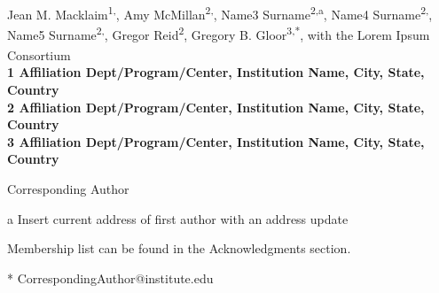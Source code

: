 \documentclass[10pt,letterpaper]{article}
\date{}
\begin{document}
\vspace*{0.35in}

\begin{flushleft}
{\Large
\textbf{}
}
\newline
\\
Jean M. Macklaim\textsuperscript{1,},
Amy McMillan\textsuperscript{2,},
Name3 Surname\textsuperscript{2,\textcurrency a},
Name4 Surname\textsuperscript{2,\ddag},
Name5 Surname\textsuperscript{2,\ddag},
Gregor Reid\textsuperscript{2},
Gregory B. Gloor\textsuperscript{3,*},
with the Lorem Ipsum Consortium\textsuperscript{\textpilcrow}
\\
\bigskip
\bf{1} Affiliation Dept/Program/Center, Institution Name, City, State, Country
\\
\bf{2} Affiliation Dept/Program/Center, Institution Name, City, State, Country
\\
\bf{3} Affiliation Dept/Program/Center, Institution Name, City, State, Country
\\
\bigskip

% 
%

\ddag Corresponding Author

\textcurrency a Insert current address of first author with an address update


\textpilcrow Membership list can be found in the Acknowledgments section.

* CorrespondingAuthor@institute.edu

\end{flushleft}
\end{document}
